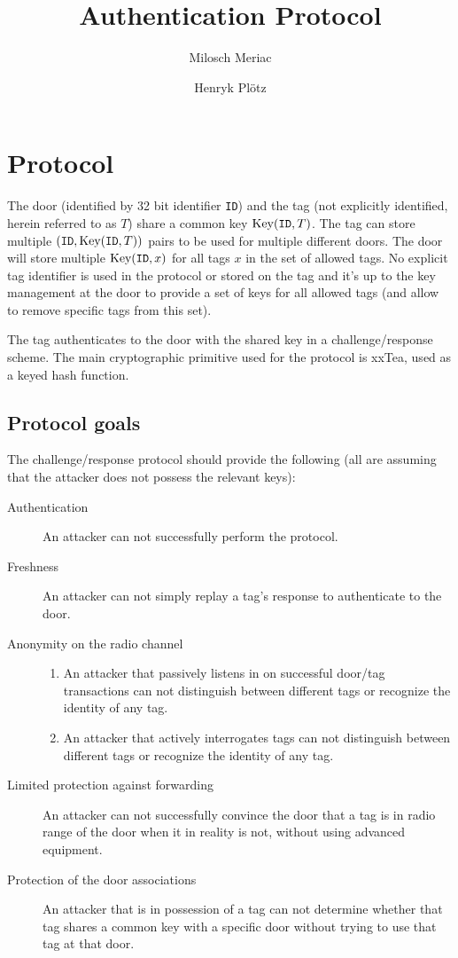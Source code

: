 \documentclass[a4paper,10pt]{scrartcl}
\title{\openbouncer{} Authentication Protocol}
\author{Milosch Meriac \and Henryk Plötz}
\begin{document}
\maketitle

\begin{abstract}

\end{abstract}

\section{Protocol}

The door (identified by 32 bit identifier \verb|ID|) and the tag (not explicitly identified, herein referred to as $T$) share a common key $\textnormal{Key}(\texttt{ID}, T)$. The tag can store multiple $(\texttt{ID}, \textnormal{Key}(\texttt{ID}, T))$ pairs to be used for multiple different doors. The door will store multiple $\textnormal{Key}(\texttt{ID}, x)$ for all tags $x$ in the set of allowed tags. No explicit tag identifier is used in the protocol or stored on the tag and it's up to the key management at the door to provide a set of keys for all allowed tags (and allow to remove specific tags from this set).

The tag authenticates to the door with the shared key in a challenge/response scheme. The main cryptographic primitive used for the protocol is xxTea, used as a keyed hash function.

\subsection{Protocol goals}
The challenge/response protocol should provide the following (all are assuming that the attacker does not possess the relevant keys):
\begin{description}
  \item[Authentication] An attacker can not successfully perform the protocol.
  \item[Freshness] An attacker can not simply replay a tag's response to authenticate to the door.
  \item[Anonymity on the radio channel] \begin{enumerate} \item An attacker that passively listens in on successful door/tag transactions can not distinguish between different tags or recognize the identity of any tag. \item An attacker that actively interrogates tags can not distinguish between different tags or recognize the identity of any tag. \end{enumerate}
  \item[Limited protection against forwarding] An attacker can not successfully convince the door that a tag is in radio range of the door when it in reality is not, without using advanced equipment.
  \item[Protection of the door associations] An attacker that is in possession of a tag can not determine whether that tag shares a common key with a specific door without trying to use that tag at that door.
\end{description}
\end{document}
